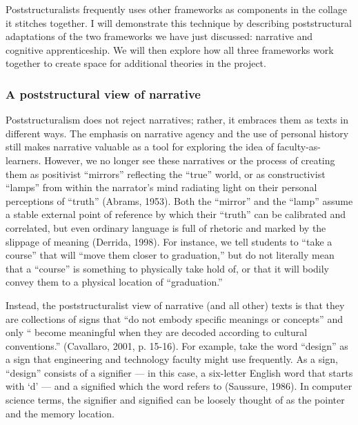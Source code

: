 Poststructuralists frequently uses other frameworks as components in the collage it stitches together. I will demonstrate this technique by describing poststructural adaptations of the two frameworks we have just discussed: narrative and cognitive apprenticeship. We will then explore how all three frameworks work together to create space for additional theories in the project.

\subsubsection{A poststructural view of narrative}

Poststructuralism does not reject narratives; rather, it embraces them as texts in different ways. The emphasis on narrative agency and the use of personal history still makes narrative valuable as a tool for exploring the idea of faculty-as-learners. However, we no longer see these narratives or the process of creating them as positivist “mirrors” reflecting the “true” world, or as constructivist “lamps” from within the narrator’s mind radiating light on their personal perceptions of “truth” (Abrams, 1953). Both the “mirror” and the “lamp” assume a stable external point of reference by which their “truth” can be calibrated and correlated, but even ordinary language is full of rhetoric and marked by the slippage of meaning (Derrida, 1998). For instance, we tell students to “take a course” that will “move them closer to graduation,” but do not literally mean that a “course” is something to physically take hold of, or that it will bodily convey them to a physical location of “graduation.”

Instead, the poststructuralist view of narrative (and all other) texts is that they are collections of signs that “do not embody specific meanings or concepts” and only “ become meaningful when they are decoded according to cultural conventions.” (Cavallaro, 2001, p. 15-16). For example, take the word “design” as a sign that engineering and technology faculty might use frequently. As a sign, “design” consists of a signifier — in this case, a six-letter English word that starts with ‘d’ — and a signified which the word refers to (Saussure, 1986). In computer science terms, the signifier and signified can be loosely thought of as the pointer and the memory location.

